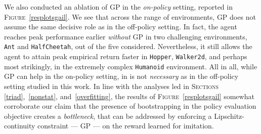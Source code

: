 We also conducted an ablation of GP in the \emph{on-policy} setting,
reported in \textsc{Figure}~\ref{resplotsgail}.
We see that across the range of environments,
GP does not assume the same decisive role as in the off-policy setting.
In fact, the agent reaches peak performance earlier \emph{without} GP in
two challenging environments, \texttt{Ant} and \texttt{HalfCheetah},
out of the five considered.
Nevertheless, it still allows the agent to attain peak empirical return faster in
\texttt{Hopper}, \texttt{Walker2d}, and perhaps most strikingly,
in the extremely complex \texttt{Humanoid} environment.
All in all, while GP can help in the on-policy setting, in is not
\emph{necessary} as in the off-policy setting studied in this work.
In line with the analyses led in \textsc{Sections}
\ref{triad},~\ref{nonstat}, and~\ref{overfitting},
the results of \textsc{Figure}~\ref{resplotsgail} somewhat
corroborate our claim that the presence of bootstrapping
in the policy evaluation objective creates a \emph{bottleneck}, that can be
addressed by enforcing a Lipschitz-continuity constraint --- GP ---
on the reward learned for imitation.

